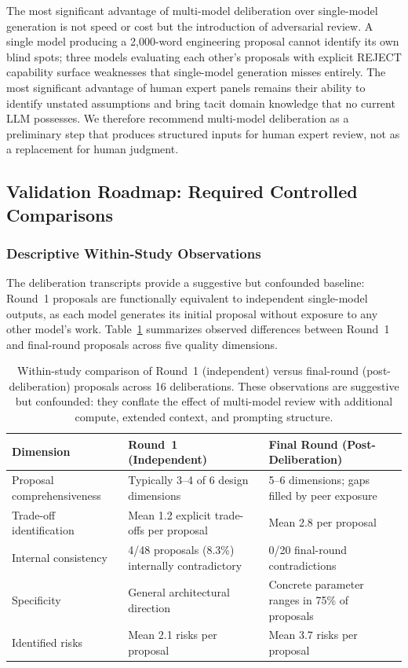 \documentclass[11pt,a4paper]{article}
\begin{document}
The most significant advantage of multi-model deliberation over single-model generation is not speed or cost but the introduction of adversarial review. A single model producing a 2{,}000-word engineering proposal cannot identify its own blind spots; three models evaluating each other's proposals with explicit REJECT capability surface weaknesses that single-model generation misses entirely. The most significant advantage of human expert panels remains their ability to identify unstated assumptions and bring tacit domain knowledge that no current LLM possesses. We therefore recommend multi-model deliberation as a preliminary step that produces structured inputs for human expert review, not as a replacement for human judgment.

\subsection{Validation Roadmap: Required Controlled Comparisons}
\label{sec:validation_roadmap}

\subsubsection{Descriptive Within-Study Observations}

The deliberation transcripts provide a suggestive but confounded baseline: Round~1 proposals are functionally equivalent to independent single-model outputs, as each model generates its initial proposal without exposure to any other model's work. Table~\ref{tab:baseline_comparison} summarizes observed differences between Round~1 and final-round proposals across five quality dimensions.

\begin{table}[ht]
\centering
\caption{Within-study comparison of Round~1 (independent) versus final-round (post-deliberation) proposals across 16 deliberations. These observations are suggestive but confounded: they conflate the effect of multi-model review with additional compute, extended context, and prompting structure.}
\label{tab:baseline_comparison}
\begin{tabular}{@{}p{3.2cm}p{4.5cm}p{4.5cm}@{}}
\toprule
\textbf{Dimension} & \textbf{Round~1 (Independent)} & \textbf{Final Round (Post-Deliberation)} \\
\midrule
Proposal comprehensiveness & Typically 3--4 of 6 design dimensions & 5--6 dimensions; gaps filled by peer exposure \\
Trade-off identification & Mean 1.2 explicit trade-offs per proposal & Mean 2.8 per proposal \\
Internal consistency & 4/48 proposals (8.3\%) internally contradictory & 0/20 final-round contradictions \\
Specificity & General architectural direction & Concrete parameter ranges in 75\% of proposals \\
Identified risks & Mean 2.1 risks per proposal & Mean 3.7 risks per proposal \\
\bottomrule
\end{tabular}
\end{table}
\end{document}
